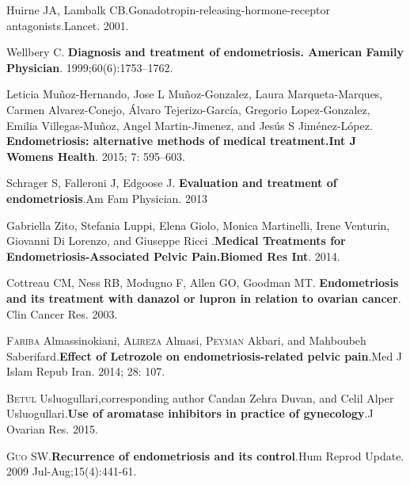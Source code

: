 \documentclass[12pt]{article} %
\begin{document}
Huirne JA, Lambalk CB.Gonadotropin-releasing-hormone-receptor antagonists.Lancet. 2001.

Wellbery C.\textbf{ Diagnosis and treatment of endometriosis. American Family Physician}. 1999;60(6):1753–1762.

Leticia Muñoz-Hernando, Jose L Muñoz-Gonzalez, Laura Marqueta-Marques, Carmen Alvarez-Conejo, Álvaro Tejerizo-García, Gregorio Lopez-Gonzalez, Emilia Villegas-Muñoz, Angel Martin-Jimenez, and Jesús S Jiménez-López. \textbf{Endometriosis: alternative methods of medical treatment.Int J Womens Health}. 2015; 7: 595–603. 

Schrager S, Falleroni J, Edgoose J.\textbf{ Evaluation and treatment of endometriosis}.Am Fam Physician. 2013

Gabriella Zito, Stefania Luppi, Elena Giolo, Monica Martinelli, Irene Venturin, Giovanni Di Lorenzo, and Giuseppe Ricci .\textbf{Medical Treatments for Endometriosis-Associated Pelvic Pain.Biomed Res Int}. 2014.

Cottreau CM, Ness RB, Modugno F, Allen GO, Goodman MT. \textbf{Endometriosis and its treatment with danazol or lupron in relation to ovarian cancer}. Clin Cancer Res. 2003.

\textsc{Fariba} Almassinokiani, \textsc{Alireza} Almasi, \textsc{Peyman} Akbari, and Mahboubeh Saberifard.\textbf{Effect of Letrozole on endometriosis-related pelvic pain}.Med J Islam Repub Iran. 2014; 28: 107. 

\textsc{Betul} Usluogullari,corresponding author Candan Zehra Duvan, and Celil Alper Usluogullari.\textbf{Use of aromatase inhibitors in practice of gynecology}.J Ovarian Res. 2015.

\textsc{Guo} SW.\textbf{Recurrence of endometriosis and its control}.Hum Reprod Update. 2009 Jul-Aug;15(4):441-61.
\end{document}
